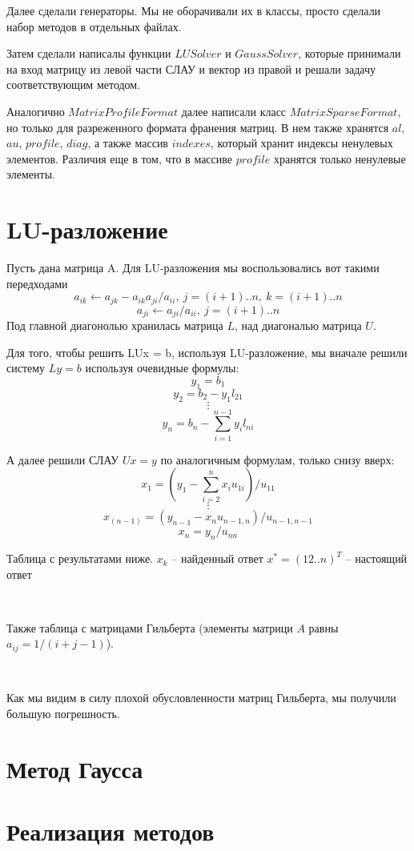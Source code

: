 Далее сделали генераторы. Мы не оборачивали их в классы, просто сделали набор методов в отдельных файлах.

Затем сделали написалы функции $LUSolver$ и $GaussSolver$, которые принимали на вход 
матрицу из левой части СЛАУ и вектор из правой и решали задачу соответствующим методом.

Аналогично $MatrixProfileFormat$ далее написали класс $MatrixSparseFormat$, но только для разреженного формата
франения матриц. В нем также хранятся $al$, $au$, $profile$, $diag$, а также массив $indexes$, 
который хранит индексы ненулевых элементов. Различия еще в том, что 
в массиве $profile$ хранятся только ненулевые элементы.

\newpage
\section{LU-разложение}

Пусть дана матрица A. Для LU-разложения мы воспользовались вот такими передходами
$$a_{ik} \leftarrow a_{jk} - a_{ik}a_{ji}/a_{ii}, \ j = (i + 1)..n, \ k = (i + 1)..n$$
$$a_{ji} \leftarrow a_{ji}/a_{ii}, \ j = (i + 1)..n$$
Под главной диагонолью хранилась матрица $L$, над диагональю матрица $U$.

Для того, чтобы решить LUx = b, используя LU-разложение, мы вначале решили систему $Ly = b$
используя очевидные формулы:
$$y_1 = b_1$$
$$y_2 = b_2 - y_1l_{21}$$
$$\vdots$$
$$y_n = b_n - \sum_{i = 1}^{n - 1}y_il_{ni}$$


А далее решили СЛАУ $Ux = y$ по аналогичным формулам, только снизу вверх:
$$x_1 = (y_1 - \sum_{i = 2}^{n}x_iu_{1i})/u_{11}$$
$$\vdots$$
$$x_(n - 1) = (y_{n - 1} - x_nu_{n - 1, n})/u_{n - 1, n - 1}$$
$$x_n = y_n/u_{nn}$$

Таблица с результатами ниже.
$x_k$ -- найденный ответ
$x^* = (1 2 .. n)^T$ -- настоящий ответ 


\

Также таблица с матрицами Гильберта (элементы матрици $A$ равны \newline $a_{ij} = 1/(i + j - 1)$).

\


Как мы видим в силу плохой обусловленности матриц Гильберта, мы получили большую погрешность.


\newpage
\section{Метод Гаусса}


\newpage
\section{Реализация методов}
